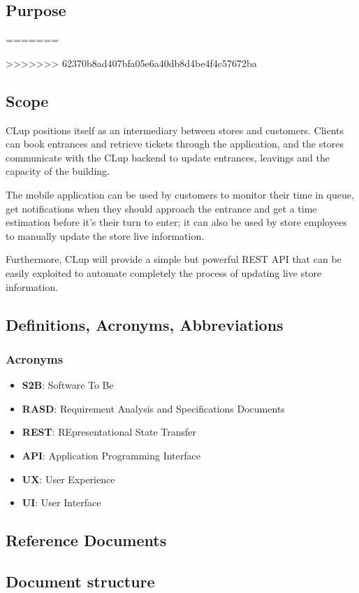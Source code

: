 \subsection{Purpose}
=======

>>>>>>> 62370b8ad407bfa05e6a40db8d4be4f4c57672ba
\subsection{Scope}
CLup positions itself as an intermediary between stores and customers. Clients can book entrances and retrieve tickets through the application, and the stores communicate with the CLup backend to update entrances, leavings and the capacity of the building.

\medskip

The mobile application can be used by customers to monitor their time in queue, get notifications when they should approach the entrance and get a time estimation before it's their turn to enter; it can also be used by store employees to manually update the store live information.

\medskip

Furthermore, CLup will provide a simple but powerful REST API that can be easily exploited to automate completely the process of updating live store information.

\vfill

\pagebreak

\subsection{Definitions, Acronyms, Abbreviations}

\subsubsection{Acronyms}

\begin{itemize}
      \item \textbf{S2B}: Software To Be
      \item \textbf{RASD}: Requirement Analysis and Specifications Documents
      \item \textbf{REST}: REpresentational State Transfer
      \item \textbf{API}: Application Programming Interface
      \item \textbf{UX}: User Experience
      \item \textbf{UI}: User Interface
\end{itemize}

\subsection{Reference Documents}
\subsection{Document structure}
